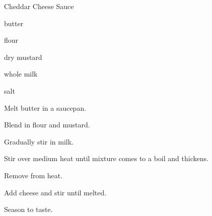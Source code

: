 \begin{recipe}{Cheddar Cheese Sauce}{}{}

\begin{ingredients}
\item {} butter
\item {} flour
\item \tp{\half} dry mustard
\item {} whole milk
\item \C{1\half} 
\item salt
\end{ingredients}

\begin{directions}
\item Melt butter in a saucepan.
\item Blend in flour and mustard.
\item Gradually stir in milk.
\item Stir over medium heat until mixture comes to a boil and thickens.
\item Remove from heat.
\item Add cheese and stir until melted.
\item Season to taste.
\end{directions}

\end{recipe}
